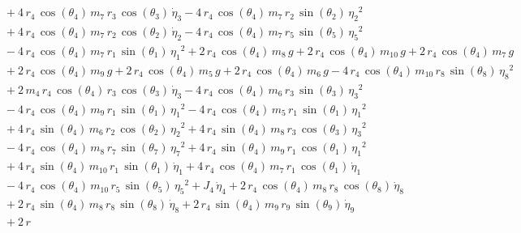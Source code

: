 \begin{eqnarray*}
 \\ &&\quad\mbox{} + 4\,r_{4}\,\cos({\theta_{4}})\,m_{7}\,r_{3}\,\cos(
{\theta_{3}})\,{\dot{\eta}_{3}} - 4\,r_{4}\,\cos({\theta_{4}})\,m_{7}
\,r_{2}\,\sin({\theta_{2}})\,{{\eta_{2}}}^2 \\ &&\quad\mbox{} + 4\,r_{
4}\,\cos({\theta_{4}})\,m_{7}\,r_{2}\,\cos({\theta_{2}})\,{\dot{\eta}
_{2}} - 4\,r_{4}\,\cos({\theta_{4}})\,m_{7}\,r_{5}\,\sin({\theta_{5}})
\,{{\eta_{5}}}^2 \\ &&\quad\mbox{} - 4\,r_{4}\,\cos({\theta_{4}})\,m_{
7}\,r_{1}\,\sin({\theta_{1}})\,{{\eta_{1}}}^2 + 2\,r_{4}\,\cos({\theta
_{4}})\,m_{8}\,g + 2\,r_{4}\,\cos({\theta_{4}})\,m_{10}\,g + 2\,r_{4}
\,\cos({\theta_{4}})\,m_{7}\,g \\ &&\quad\mbox{} + 2\,r_{4}\,\cos({
\theta_{4}})\,m_{9}\,g + 2\,r_{4}\,\cos({\theta_{4}})\,m_{5}\,g + 2\,r
_{4}\,\cos({\theta_{4}})\,m_{6}\,g - 4\,r_{4}\,\cos({\theta_{4}})\,m_{
10}\,r_{8}\,\sin({\theta_{8}})\,{{\eta_{8}}}^2 \\ &&\quad\mbox{} + 2\,
m_{4}\,r_{4}\,\cos({\theta_{4}})\,r_{3}\,\cos({\theta_{3}})\,{
\dot{\eta}_{3}} - 4\,r_{4}\,\cos({\theta_{4}})\,m_{6}\,r_{3}\,\sin({
\theta_{3}})\,{{\eta_{3}}}^2 \\ &&\quad\mbox{} - 4\,r_{4}\,\cos({
\theta_{4}})\,m_{9}\,r_{1}\,\sin({\theta_{1}})\,{{\eta_{1}}}^2 - 4\,r
_{4}\,\cos({\theta_{4}})\,m_{5}\,r_{1}\,\sin({\theta_{1}})\,{{\eta_{1}
}}^2 \\ &&\quad\mbox{} + 4\,r_{4}\,\sin({\theta_{4}})\,m_{6}\,r_{2}\,
\cos({\theta_{2}})\,{{\eta_{2}}}^2 + 4\,r_{4}\,\sin({\theta_{4}})\,m_{
8}\,r_{3}\,\cos({\theta_{3}})\,{{\eta_{3}}}^2 \\ &&\quad\mbox{} - 4\,r
_{4}\,\cos({\theta_{4}})\,m_{8}\,r_{7}\,\sin({\theta_{7}})\,{{\eta_{7}
}}^2 + 4\,r_{4}\,\sin({\theta_{4}})\,m_{9}\,r_{1}\,\cos({\theta_{1}})
\,{{\eta_{1}}}^2 \\ &&\quad\mbox{} + 4\,r_{4}\,\sin({\theta_{4}})\,m_{
10}\,r_{1}\,\sin({\theta_{1}})\,{\dot{\eta}_{1}} + 4\,r_{4}\,\cos({
\theta_{4}})\,m_{7}\,r_{1}\,\cos({\theta_{1}})\,{\dot{\eta}_{1}}
 \\ &&\quad\mbox{} - 4\,r_{4}\,\cos({\theta_{4}})\,m_{10}\,r_{5}\,\sin
({\theta_{5}})\,{{\eta_{5}}}^2 + J_{4}\,{\dot{\eta}_{4}} + 2\,r_{4}\,
\cos({\theta_{4}})\,m_{8}\,r_{8}\,\cos({\theta_{8}})\,{\dot{\eta}_{8}}
 \\ &&\quad\mbox{} + 2\,r_{4}\,\sin({\theta_{4}})\,m_{8}\,r_{8}\,\sin(
{\theta_{8}})\,{\dot{\eta}_{8}} + 2\,r_{4}\,\sin({\theta_{4}})\,m_{9}
\,r_{9}\,\sin({\theta_{9}})\,{\dot{\eta}_{9}} \\ &&\quad\mbox{} + 2\,r

\end{eqnarray*}
